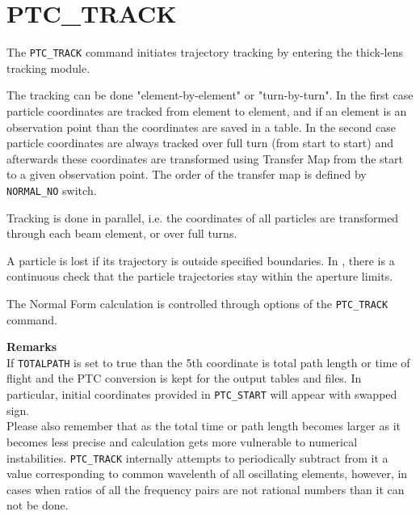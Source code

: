 \section{PTC\_TRACK}
\label{sec:ptc-track}

The \texttt{PTC\_TRACK} command initiates trajectory tracking by
entering the thick-lens tracking module.  

The tracking can be done "element-by-element" or "turn-by-turn".
In the first case particle coordinates are tracked from element to element,
and if an element is an observation point than the coordinates are saved in a table.
In the second case particle coordinates are always tracked over full turn (from start to start) 
and afterwards these coordinates are transformed using Transfer Map from the start to a given observation point.
The order of the transfer map is defined by \texttt{NORMAL\_NO} switch.

Tracking is done in parallel, i.e. the coordinates of all particles are
transformed through each beam element, or over full turns. 

A particle is lost if its trajectory is outside specified boundaries. 
In \ptc, there is a continuous check that the particle trajectories stay
within the aperture limits.  

The Normal Form calculation is controlled through options of the 
\texttt{PTC\_TRACK} command.

\textbf{Remarks} \\
If \texttt{TOTALPATH} is set to true than the 5th coordinate is 
total path length or time of flight and the PTC conversion is kept
for the output tables and files.
In particular, initial coordinates provided in \texttt{PTC\_START}
will appear with swapped sign. \\
Please also remember that as the total time or path length becomes
larger as it becomes less precise and calculation gets more vulnerable
to numerical instabilities. \texttt{PTC\_TRACK} internally attempts to 
periodically subtract from it a value corresponding to 
common wavelenth of all oscillating elements, however, in cases when
ratios of all the frequency pairs are not rational numbers 
than it can not be done. 



